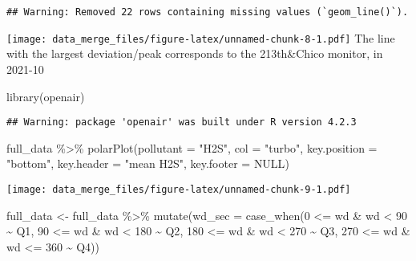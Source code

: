 \documentclass[
]{article}
\newenvironment{Shaded}{\begin{snugshade}}{\end{snugshade}}
\newcommand{\AttributeTok}[1]{\textcolor[rgb]{0.77,0.63,0.00}{#1}}
\newcommand{\ConstantTok}[1]{\textcolor[rgb]{0.00,0.00,0.00}{#1}}
\newcommand{\DecValTok}[1]{\textcolor[rgb]{0.00,0.00,0.81}{#1}}
\newcommand{\FunctionTok}[1]{\textcolor[rgb]{0.00,0.00,0.00}{#1}}
\newcommand{\NormalTok}[1]{#1}
\newcommand{\OtherTok}[1]{\textcolor[rgb]{0.56,0.35,0.01}{#1}}
\newcommand{\SpecialCharTok}[1]{\textcolor[rgb]{0.00,0.00,0.00}{#1}}
\newcommand{\StringTok}[1]{\textcolor[rgb]{0.31,0.60,0.02}{#1}}
\begin{document}
\begin{verbatim}
## Warning: Removed 22 rows containing missing values (`geom_line()`).
\end{verbatim}

\texttt{[image: data\_merge\_files/figure-latex/unnamed-chunk-8-1.pdf]}
The line with the largest deviation/peak corresponds to the 213th\&Chico
monitor, in 2021-10

\begin{Shaded}
\begin{Highlighting}[]
\FunctionTok{library}\NormalTok{(openair)}
\end{Highlighting}
\end{Shaded}

\begin{verbatim}
## Warning: package 'openair' was built under R version 4.2.3
\end{verbatim}

\begin{Shaded}
\begin{Highlighting}[]
\NormalTok{full\_data }\SpecialCharTok{\%\textgreater{}\%}
  \FunctionTok{polarPlot}\NormalTok{(}\AttributeTok{pollutant =} \StringTok{"H2S"}\NormalTok{, }\AttributeTok{col =} \StringTok{"turbo"}\NormalTok{, }
            \AttributeTok{key.position =} \StringTok{"bottom"}\NormalTok{,}
            \AttributeTok{key.header =} \StringTok{"mean H2S"}\NormalTok{, }
            \AttributeTok{key.footer =} \ConstantTok{NULL}\NormalTok{)}
\end{Highlighting}
\end{Shaded}

\texttt{[image: data\_merge\_files/figure-latex/unnamed-chunk-9-1.pdf]}

\begin{Shaded}
\begin{Highlighting}[]
\NormalTok{full\_data }\OtherTok{\textless{}{-}}\NormalTok{ full\_data }\SpecialCharTok{\%\textgreater{}\%}
  \FunctionTok{mutate}\NormalTok{(}\AttributeTok{wd\_sec =} \FunctionTok{case\_when}\NormalTok{(}\DecValTok{0} \SpecialCharTok{\textless{}=}\NormalTok{ wd }\SpecialCharTok{\&}\NormalTok{ wd }\SpecialCharTok{\textless{}} \DecValTok{90} \SpecialCharTok{\textasciitilde{}} \StringTok{\textquotesingle{}Q1\textquotesingle{}}\NormalTok{,}
                            \DecValTok{90} \SpecialCharTok{\textless{}=}\NormalTok{ wd }\SpecialCharTok{\&}\NormalTok{ wd }\SpecialCharTok{\textless{}} \DecValTok{180} \SpecialCharTok{\textasciitilde{}} \StringTok{\textquotesingle{}Q2\textquotesingle{}}\NormalTok{,}
                            \DecValTok{180} \SpecialCharTok{\textless{}=}\NormalTok{ wd }\SpecialCharTok{\&}\NormalTok{ wd }\SpecialCharTok{\textless{}} \DecValTok{270} \SpecialCharTok{\textasciitilde{}} \StringTok{\textquotesingle{}Q3\textquotesingle{}}\NormalTok{,}
                            \DecValTok{270} \SpecialCharTok{\textless{}=}\NormalTok{ wd }\SpecialCharTok{\&}\NormalTok{ wd }\SpecialCharTok{\textless{}=} \DecValTok{360} \SpecialCharTok{\textasciitilde{}} \StringTok{\textquotesingle{}Q4\textquotesingle{}}\NormalTok{))}
\end{Highlighting}
\end{Shaded}
\end{document}
